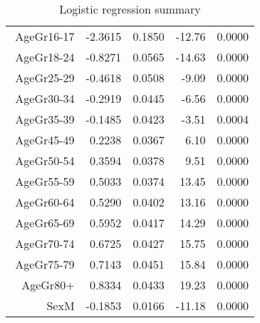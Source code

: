 \begin{table}[ht]
\begin{tabular}{rrrrr}
$$  AgeGr16-17 & -2.3615 & 0.1850 & -12.76 & 0.0000 \\ 
  AgeGr18-24 & -0.8271 & 0.0565 & -14.63 & 0.0000 \\ 
  AgeGr25-29 & -0.4618 & 0.0508 & -9.09 & 0.0000 \\ 
  AgeGr30-34 & -0.2919 & 0.0445 & -6.56 & 0.0000 \\ 
  AgeGr35-39 & -0.1485 & 0.0423 & -3.51 & 0.0004 \\ 
  AgeGr45-49 & 0.2238 & 0.0367 & 6.10 & 0.0000 \\ 
  AgeGr50-54 & 0.3594 & 0.0378 & 9.51 & 0.0000 \\ 
  AgeGr55-59 & 0.5033 & 0.0374 & 13.45 & 0.0000 \\ 
  AgeGr60-64 & 0.5290 & 0.0402 & 13.16 & 0.0000 \\ 
  AgeGr65-69 & 0.5952 & 0.0417 & 14.29 & 0.0000 \\ 
  AgeGr70-74 & 0.6725 & 0.0427 & 15.75 & 0.0000 \\ 
  AgeGr75-79 & 0.7143 & 0.0451 & 15.84 & 0.0000 \\ 
  AgeGr80+ & 0.8334 & 0.0433 & 19.23 & 0.0000 \\ 
  SexM & -0.1853 & 0.0166 & -11.18 & 0.0000 \\ 
   \hline
\end{tabular}
\caption{Logistic regression summary} 
\end{table}
